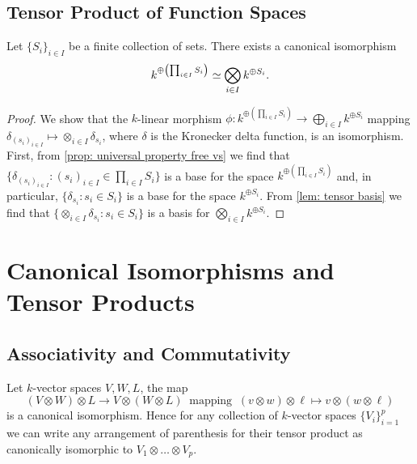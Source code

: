 
\subsection{Tensor Product of Function Spaces}

\begin{proposition}
    Let \(\{S_i\}_{i \in I}\) be a finite collection of sets. There exists a
    canonical isomorphism
    \[
        k^{\oplus \left( \prod_{i \in I} S_i \right)} \simeq \bigotimes_{i \in I}
        k^{\oplus S_i}.
    \]
\end{proposition}

\begin{proof}
    We show that the \(k\)-linear morphism \(\phi: k^{\oplus \left( \prod_{i \in
                I} S_i \right)} \to \bigoplus_{i \in I} k^{\oplus S_i}\) mapping
    \(\delta_{(s_i)_{i \in I}} \mapsto \otimes_{i \in I} \delta_{s_i}\), where
    \(\delta\) is the Kronecker delta function, is an isomorphism. First, from
    \cref{prop: universal property free vs} we find that \(\{\delta_{(s_i)_{i \in
                I}} \colon (s_i)_{i \in I} \in \prod_{i \in I} S_i\}\) is a base for the space
    \(k^{\oplus \left( \prod_{i \in I} S_i \right)}\) and, in particular,
    \(\{\delta_{s_i} \colon s_i \in S_i\}\) is a base for the space \(k^{\oplus S_i}\).
    From \cref{lem: tensor basis} we find that \(\{\otimes_{i \in I} \delta_{s_i}
    \colon s_i \in S_i\}\) is a basis for \(\bigotimes_{i \in I} k^{\oplus S_i}\).
\end{proof}

\section{Canonical Isomorphisms and Tensor Products}

\subsection{Associativity and Commutativity}

\begin{proposition}[Associativity]\label{prop: associativity tensor prod}
    Let \(k\)-vector spaces \(V, W, L\), the map
    \[
        (V \otimes W) \otimes L \to V \otimes (W \otimes L)\ \text{ mapping }\ (v
        \otimes w) \otimes \ell \mapsto v \otimes (w \otimes \ell)
    \]
    is a canonical isomorphism. Hence for any collection of \(k\)-vector spaces
    \(\{V_i\}_{i=1}^p\) we can write any arrangement of parenthesis for their
    tensor product as canonically isomorphic to \(V_1 \otimes \dots \otimes V_p\).
\end{proposition}

